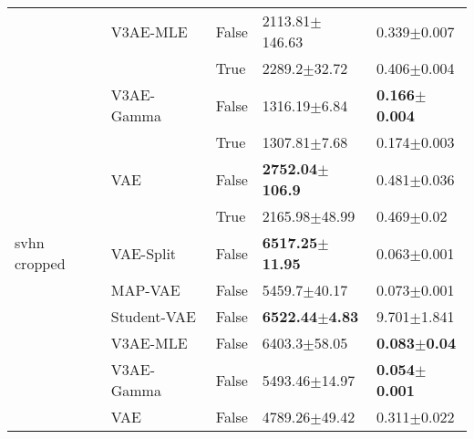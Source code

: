 \begin{tabular}{lllll}
             & V3AE-MLE & False &          2113.81$\pm$146.63 &           0.339$\pm$0.007 \\
             &     & True  &            2289.2$\pm$32.72 &           0.406$\pm$0.004 \\
             & V3AE-Gamma & False &            1316.19$\pm$6.84 &  \textbf{0.166$\pm$0.004} \\
             &     & True  &            1307.81$\pm$7.68 &           0.174$\pm$0.003 \\
             & VAE & False &  \textbf{2752.04$\pm$106.9} &           0.481$\pm$0.036 \\
             &     & True  &           2165.98$\pm$48.99 &            0.469$\pm$0.02 \\
svhn cropped & VAE-Split & False &  \textbf{6517.25$\pm$11.95} &           0.063$\pm$0.001 \\
             & MAP-VAE & False &            5459.7$\pm$40.17 &           0.073$\pm$0.001 \\
             & Student-VAE & False &   \textbf{6522.44$\pm$4.83} &           9.701$\pm$1.841 \\
             & V3AE-MLE & False &            6403.3$\pm$58.05 &   \textbf{0.083$\pm$0.04} \\
             & V3AE-Gamma & False &           5493.46$\pm$14.97 &  \textbf{0.054$\pm$0.001} \\
             & VAE & False &           4789.26$\pm$49.42 &           0.311$\pm$0.022 \\
\bottomrule
\end{tabular}

